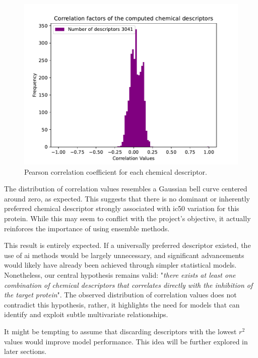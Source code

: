 \documentclass[11pt]{article}
\begin{document}
\begin{figure}[H]
	\centering
	\includegraphics[width = \textwidth, trim={0.6cm 0.3cm 1.5cm 1.35cm}, clip]{../Plots/ChEMBL_ExtractorData_CHEMBL230_IC50_1000CorrelationFactors.pdf}
	\caption{Pearson correlation coefficient for each chemical descriptor.}
	\label{figureGraphicCorrelationFactor}
\end{figure}

The distribution of correlation values resembles a Gaussian bell curve centered around zero, as expected. This suggests that there is no dominant or inherently preferred chemical descriptor strongly associated with \gls{ic50} variation for this protein. While this may seem to conflict with the project's objective, it actually reinforces the importance of using ensemble methods.

This result is entirely expected. If a universally preferred descriptor existed, the use of \gls{ai} methods would be largely unnecessary, and significant advancements would likely have already been achieved through simpler statistical models. Nonetheless, our central hypothesis remains valid: "\emph{there exists at least one combination of chemical descriptors that correlates directly with the inhibition of the target protein}". The observed distribution of correlation values does not contradict this hypothesis, rather, it highlights the need for models that can identify and exploit subtle multivariate relationships.

It might be tempting to assume that discarding descriptors with the lowest $r^2$ values would improve model performance. This idea will be further explored in later sections.
\end{document}

